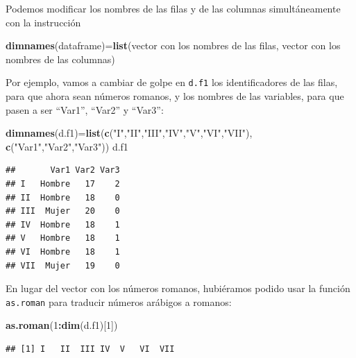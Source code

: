 \documentclass[]{book}
\newenvironment{Shaded}{\begin{snugshade}}{\end{snugshade}}
\newcommand{\DecValTok}[1]{\textcolor[rgb]{0.00,0.00,0.81}{#1}}
\newcommand{\KeywordTok}[1]{\textcolor[rgb]{0.13,0.29,0.53}{\textbf{#1}}}
\newcommand{\NormalTok}[1]{#1}
\newcommand{\OperatorTok}[1]{\textcolor[rgb]{0.81,0.36,0.00}{\textbf{#1}}}
\newcommand{\StringTok}[1]{\textcolor[rgb]{0.31,0.60,0.02}{#1}}
\theoremstyle{definition}
\theoremstyle{definition}
\theoremstyle{definition}
\theoremstyle{remark}
\begin{document}
Podemos modificar los nombres de las filas y de las columnas simultáneamente con la instrucción

\begin{Shaded}
\begin{Highlighting}[]
\KeywordTok{dimnames}\NormalTok{(dataframe)=}\KeywordTok{list}\NormalTok{(vector con los nombres de las filas, vector con los nombres de las columnas)}
\end{Highlighting}
\end{Shaded}

Por ejemplo, vamos a cambiar de golpe en \texttt{d.f1} los identificadores de las filas, para que ahora sean números romanos, y los nombres de las variables, para que pasen a ser ``Var1'', ``Var2'' y ``Var3'':

\begin{Shaded}
\begin{Highlighting}[]
\KeywordTok{dimnames}\NormalTok{(d.f1)=}\KeywordTok{list}\NormalTok{(}\KeywordTok{c}\NormalTok{(}\StringTok{"I"}\NormalTok{,}\StringTok{"II"}\NormalTok{,}\StringTok{"III"}\NormalTok{,}\StringTok{"IV"}\NormalTok{,}\StringTok{"V"}\NormalTok{,}\StringTok{"VI"}\NormalTok{,}\StringTok{"VII"}\NormalTok{), }\KeywordTok{c}\NormalTok{(}\StringTok{"Var1"}\NormalTok{,}\StringTok{"Var2"}\NormalTok{,}\StringTok{"Var3"}\NormalTok{))}
\NormalTok{d.f1}
\end{Highlighting}
\end{Shaded}

\begin{verbatim}
##       Var1 Var2 Var3
## I   Hombre   17    2
## II  Hombre   18    0
## III  Mujer   20    0
## IV  Hombre   18    1
## V   Hombre   18    1
## VI  Hombre   18    1
## VII  Mujer   19    0
\end{verbatim}

En lugar del vector con los números romanos, hubiéramos podido usar la función \texttt{as.roman} para traducir números arábigos a romanos:

\begin{Shaded}
\begin{Highlighting}[]
\KeywordTok{as.roman}\NormalTok{(}\DecValTok{1}\OperatorTok{:}\KeywordTok{dim}\NormalTok{(d.f1)[}\DecValTok{1}\NormalTok{])}
\end{Highlighting}
\end{Shaded}

\begin{verbatim}
## [1] I   II  III IV  V   VI  VII
\end{verbatim}
\end{document}
